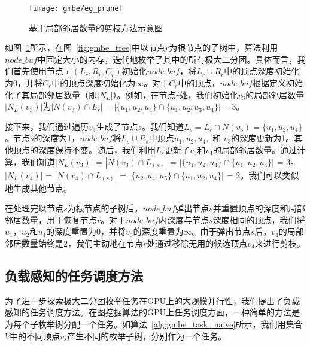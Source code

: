 \begin{figure} [H]
  \center
    \vspace{0.1in}
		\texttt{[image: gmbe/eg\_prune]}
    \vspace{0.1in}
	\caption{基于局部邻居数量的剪枝方法示意图}
	\label{fig:gmbe_prune}
\end{figure}

\begin{example}
  如图~\ref{fig:gmbe_prune}所示，在图~\ref{fig:gmbe_tree}中以节点$r$为根节点的子树中，算法利用$node\_buf$中固定大小的内存，迭代地枚举了其中的所有极大二分团。具体而言，我们首先使用节点 r $(L_r, R_r, C_r)$初始化$node\_buf$，将$L_r \cup R_r$中的顶点深度初始化为0，并将$C_r$中的顶点深度初始化为$\infty$。对于$C_r$中的顶点，$node\_buf$根据定义初始化了其局部邻居数量（即$|N_L|$）。例如，在节点$r$处，我们初始化$v_3$的局部邻居数量$|N_L(v_3)|$为$|N(v_3) \cap L_r| = 
  |\{u_1, u_2, u_4\}\cap \{u_1,u_2,u_3,u_4\}| = 3$。

  接下来，我们通过遍历$v_3$生成了节点$s$。我们知道$L_s=L_r\cap N(v_3)=\{u_1, u_2, u_4\}$。节点$s$的深度为1，$node\_buf$将$L_s\cup R_s$中顶点$u_1, u_2, u_4,$ 和 $v_3$的深度更新为1。其他顶点的深度保持不变。随后，我们利用$L_s$更新了$v_3$和$v_4$的局部邻居数量。通过计算，我们知道$|N_L(v_3)|$ = $|N(v_3) \cap L_{(s)}|$
  = $|\{u_1, u_2, u_4\} \cap \{u_1, u_2, u_4\}|$ = 3。
  $|N_L(v_4)|$ = $|N(v_4) \cap L_{(s)}|$
  = $|\{u_2, u_4, u_5\} \cap \{u_1, u_2, u_4\}|$ = 2。我们可以类似地生成其他节点。

在处理完以节点$s$为根节点的子树后，$node\_buf$弹出节点$s$并重置顶点的深度和局部邻居数量，用于恢复节点$r$。对于$node\_buf$内深度与节点$s$深度相同的顶点，我们将$u_1$，$u_2$和$u_4$的深度重置为0，并将$v_3$的深度重置为$\infty$。由于弹出节点$s$后，$v_4$的局部邻居数量始终是2，我们主动地在节点$r$处通过移除无用的候选顶点$v_4$来进行剪枝。


\end{example}


\subsection{负载感知的任务调度方法}
\label{subsec:gmbe_design_load}

为了进一步探索极大二分团枚举任务在GPU上的大规模并行性，我们提出了负载感知的任务调度方法。在图挖掘算法的GPU上任务调度方面，一种简单的方法是为每个子枚举树分配一个任务。如算法~\ref{alg:gmbe_task_naive}所示，我们用集合$V$中的不同顶点$v_s$产生不同的枚举子树，分别作为一个任务。

